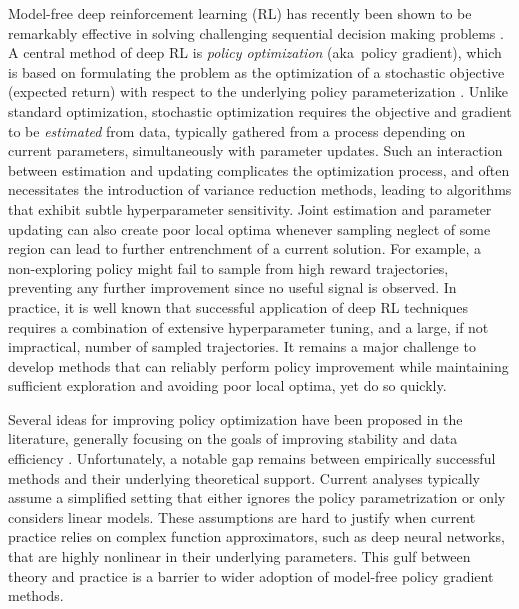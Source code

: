 
Model-free deep reinforcement learning (RL) has recently
been shown to be remarkably effective in solving
challenging sequential decision making problems
\citep{schulman2015trust,mnih2015human,silver2016mastering}.
A central method of deep RL is \emph{policy optimization}
(aka\ policy gradient),
which is based on formulating the problem
as the optimization of a stochastic objective (expected return)
with respect to the underlying policy parameterization
\citep{williams1991function,williams1992simple,sutton1998reinforcement}.
Unlike standard optimization,
stochastic optimization requires the objective and gradient to be 
\emph{estimated} from data,
typically gathered from a process depending on current parameters, 
simultaneously with parameter updates.
Such an interaction between estimation and updating
complicates the optimization process,
and often necessitates the introduction of variance reduction methods,
leading to algorithms that exhibit subtle hyperparameter sensitivity.
Joint estimation and parameter updating can also create poor local optima
whenever sampling neglect of some region
can lead to further entrenchment of a current solution.
For example, a non-exploring policy might fail to sample from high
reward trajectories,
preventing any further improvement since no useful signal is observed.
In practice, it is well known that successful application of deep RL techniques
requires a combination of extensive hyperparameter tuning,
and a large, if not impractical, number of sampled trajectories.
It remains a major challenge to develop methods that can reliably
perform policy improvement while maintaining sufficient exploration
and avoiding poor local optima, yet do so quickly.

Several ideas for improving policy optimization have been proposed
in the literature, 
generally focusing on the goals of improving stability and data efficiency
\citep{peters2010relative,van2015learning,fox2015taming,schulman2015trust,montgomery2016guided,nachum2017bridging,nachum2017trust,tangkaratt2017guide,abdolmaleki2018maximum,haarnoja2018soft}. 
Unfortunately, a notable gap remains between empirically successful methods 
and their underlying theoretical support.
Current analyses typically assume a simplified setting that either ignores the 
policy parametrization or only considers linear models.
These assumptions are hard to justify when current practice relies on 
complex function approximators, such as deep neural networks,
that are highly nonlinear in their underlying parameters.
This gulf between theory and practice is
a barrier to wider adoption of model-free policy gradient methods.

